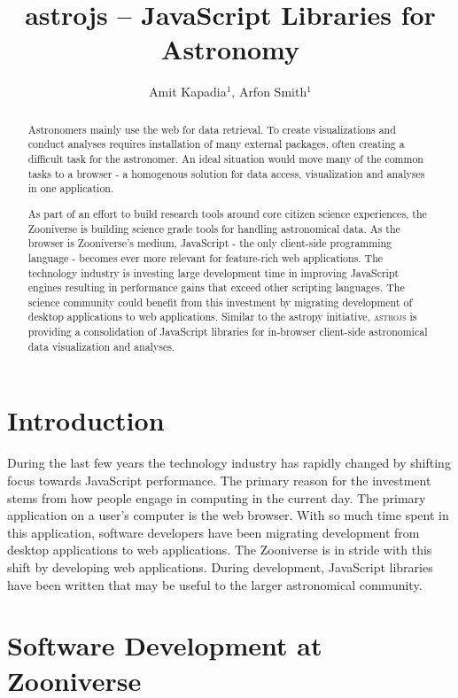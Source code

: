 \documentclass[11pt,twoside]{article}
\begin{document}
\title{astrojs -- JavaScript Libraries for Astronomy}
\author{Amit Kapadia$^1$, Arfon Smith$^1$}

\begin{abstract}
Astronomers mainly use the web for data retrieval. To create visualizations and conduct analyses requires installation of many external packages, often creating a difficult task for the astronomer. An ideal situation would move many of the common tasks to a browser - a homogenous solution for data access, visualization and analyses in one application.

As part of an effort to build research tools around core citizen science experiences, the Zooniverse is building science grade tools for handling astronomical data. As the browser is Zooniverse's medium, JavaScript - the only client-side programming language - becomes ever more relevant for feature-rich web applications. The technology industry is investing large development time in improving JavaScript engines resulting in performance gains that exceed other scripting languages. The science community could benefit from this investment by migrating development of desktop applications to web applications.  Similar to the astropy initiative, \textsc{astrojs} is providing a consolidation of JavaScript libraries for in-browser client-side astronomical data visualization and analyses.
\end{abstract}

\section{Introduction}
During the last few years the technology industry has rapidly changed by shifting focus towards JavaScript performance.  The primary reason for the investment stems from how people engage in computing in the current day.  The primary application on a user's computer is the web browser.  With so much time spent in this application, software developers have been migrating development from desktop applications to web applications.  The Zooniverse is in stride with this shift by developing web applications.  During development, JavaScript libraries have been written that may be useful to the larger astronomical community.

\section{Software Development at Zooniverse}
\end{document}
